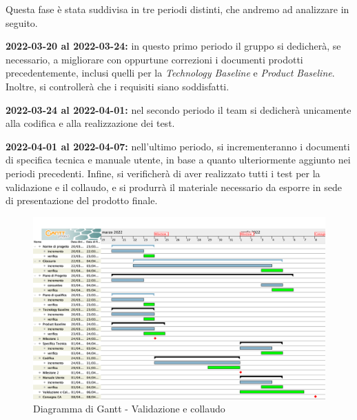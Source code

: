 Questa fase è stata suddivisa in tre periodi distinti, che andremo ad analizzare in seguito.


\textbf{2022-03-20 al 2022-03-24:} in questo primo periodo il gruppo si dedicherà,  se necessario,  a migliorare con oppurtune correzioni i documenti prodotti precedentemente,  inclusi quelli per la \textit{Technology Baseline} e \textit{Product Baseline}.  Inoltre,  si controllerà che i requisiti siano soddisfatti.


\textbf{2022-03-24 al 2022-04-01:} nel secondo periodo il team si dedicherà unicamente alla codifica e alla realizzazione dei test.


\textbf{2022-04-01 al 2022-04-07:} nell'ultimo periodo,  si incrementeranno i documenti di specifica tecnica e manuale utente,  in base a quanto ulteriormente aggiunto nei periodi precedenti.  Infine,  si verificherà di aver realizzato tutti i test per la validazione e il collaudo,  e si produrrà il materiale necessario da esporre in sede di presentazione del prodotto finale.

\begin{figure}[H]
\centering
\includegraphics[scale=0.35]{Sezioni/gantt/validazione_collaudo.png}
\caption{Diagramma di Gantt - Validazione e collaudo}
\end{figure}